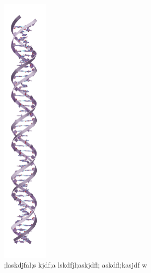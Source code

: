 \begin{figure}
  \begin{center}
    \includegraphics[width=0.20\textwidth]{Figures/DNA1.png}
  \end{center}
  \caption{;laskdjfal;s kjdf;a lskdfjl;askjdfl; askdfl;kasjdf w}
\end{figure}
